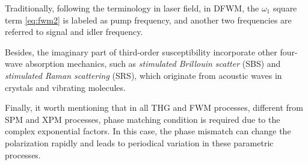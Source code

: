 Traditionally, following the terminology in laser field, in DFWM, the $\omega_1$ square term \autoref{eq:fwm2} is labeled as pump frequency, and another two frequencies are referred to signal and idler frequency.

\bigskip
Besides, the imaginary part of third-order susceptibility incorporate other four-wave absorption mechanics, such as \textit{stimulated Brillouin scatter} (SBS) and \textit{stimulated Raman scattering} (SRS), which originate from acoustic waves in crystals and vibrating molecules.

Finally, it worth mentioning that in all THG and FWM processes, different from SPM and XPM processes, phase matching condition is required due to the complex exponential factors. In this case, the phase mismatch can change the polarization rapidly and leads to periodical variation in these parametric processes.

